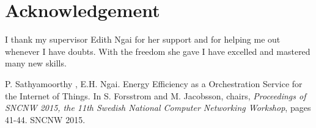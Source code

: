 \documentclass{UUThesisTemplate}
\begin{document}
\frontmatter

    \frontmatterCS 
    \chapter*{Acknowledgement}
    I thank my supervisor Edith Ngai for her support and for helping me out whenever I have doubts. With the freedom she gave I have excelled and mastered many new skills.
   \dedication{Dedicated to \\ \ \\  The eyes: \textbf{Wife and Mom} \\ The shoulders: \textbf{Dad and Father-in-law} \\  The arms: \textbf{Brothers and Sisters} \\ Two little stars : \textbf{Charu Nethra , Priyanga} \\ The 'indeed-in-needs' : All my great \textbf{Friends} \\ \& \\ The precious rarities: Motivating \textbf{Relatives} }
 
    \begin{listofpapers}
    	\item P. Sathyamoorthy , E.H. Ngai. Energy Efficiency as a Orchestration Service for the Internet of Things. In S. Forsstrom and M. Jacobsson, chairs, \emph{Proceedings of SNCNW 2015, the 11th Swedish National Computer Networking Workshop}, pages 41-44. SNCNW 2015. \label{apaperlabel}
    \end{listofpapers}
    
    
    \begingroup
        \tableofcontents
    \endgroup
    
    \listoftables
    \listoffigures

\mainmatter
   
\end{document}
